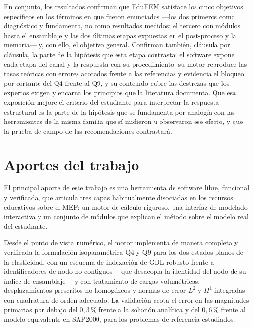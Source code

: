 En conjunto, los resultados confirman que EduFEM satisface los cinco objetivos específicos en los términos en que fueron enunciados —los dos primeros como diagnóstico y fundamento, no como resultados medidos; el tercero con módulos hasta el ensamblaje y las dos últimas etapas expuestas en el post-proceso y la memoria— y, con ello, el objetivo general. Confirman también, cláusula por cláusula, la parte de la hipótesis que esta etapa contrasta: el software expone cada etapa del canal y la respuesta con su procedimiento, su motor reproduce las tasas teóricas con errores acotados frente a las referencias y evidencia el bloqueo por cortante del Q4 frente al Q9, y su contenido cubre las destrezas que los expertos exigen y encarna los principios que la literatura documenta. Que esa exposición mejore el criterio del estudiante para interpretar la respuesta estructural es la parte de la hipótesis que se fundamenta por analogía con las herramientas de la misma familia que sí midieron u observaron ese efecto, y que la prueba de campo de las recomendaciones contrastará.

\section*{Aportes del trabajo}

El principal aporte de este trabajo es una herramienta de software libre, funcional y verificada, que articula tres capas habitualmente disociadas en los recursos educativos sobre el MEF: un motor de cálculo riguroso, una interfaz de modelado interactiva y un conjunto de módulos que explican el método sobre el modelo real del estudiante.

Desde el punto de vista numérico, el motor implementa de manera completa y verificada la formulación isoparamétrica Q4 y Q9 para los dos estados planos de la elasticidad, con un esquema de indexación de GDL robusto frente a identificadores de nodo no contiguos —que desacopla la identidad del nodo de su índice de ensamblaje— y con tratamiento de cargas volumétricas, desplazamientos prescritos no homogéneos y normas de error $L^2$ y $H^1$ integradas con cuadratura de orden adecuado. La validación acota el error en las magnitudes primarias por debajo del $0{,}3\,\%$ frente a la solución analítica y del $0{,}6\,\%$ frente al modelo equivalente en SAP2000, para los problemas de referencia estudiados.

